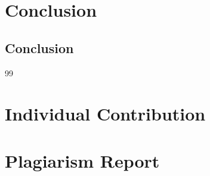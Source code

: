 \documentclass[12pt,a4paper]{report}
\begin{document}
\chapter{Conclusion}
\section{Conclusion}

\begin{thebibliography}{99}
\end{thebibliography}

\chapter*{Individual Contribution}

\chapter*{Plagiarism Report}
\end{document}

